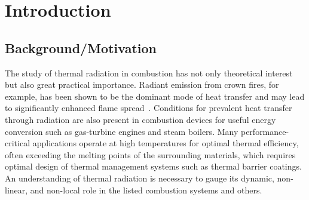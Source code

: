 \addchapheadtotoc

\chapter{Introduction} \label{chapter:Introduction}

\section{Background/Motivation}
The study of thermal radiation in combustion has not only theoretical interest but also great practical importance. Radiant emission from crown fires, for example, has been shown to be the dominant mode of heat transfer and may lead to significantly enhanced flame spread~\cite{Valendik2008EffectEnvironment}. Conditions for prevalent heat transfer through radiation are also present in combustion devices for useful energy conversion such as gas-turbine engines and steam boilers.
Many performance-critical applications operate at high temperatures for optimal thermal efficiency, often exceeding the melting points of the surrounding materials, which requires optimal design of thermal management systems such as thermal barrier coatings.
An understanding of thermal radiation is necessary to gauge its dynamic, non-linear, and non-local role in the listed combustion systems and others.

